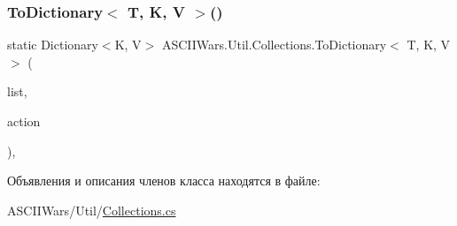 \subsubsection{\texorpdfstring{To\+Dictionary$<$ T, K, V $>$()}{ToDictionary< T, K, V >()}}
{\footnotesize\ttfamily static Dictionary$<$K, V$>$ A\+S\+C\+I\+I\+Wars.\+Util.\+Collections.\+To\+Dictionary$<$ T, K, V $>$ (\begin{DoxyParamCaption}\item[{this List$<$ T $>$}]{list,  }\item[{Func$<$ T, Key\+Value\+Pair$<$ K, V $>$$>$}]{action }\end{DoxyParamCaption})\hspace{0.3cm}{\ttfamily [inline]}, {\ttfamily [static]}}



Объявления и описания членов класса находятся в файле\+:\begin{DoxyCompactItemize}
\item 
A\+S\+C\+I\+I\+Wars/\+Util/\hyperlink{_collections_8cs}{Collections.\+cs}\end{DoxyCompactItemize}
